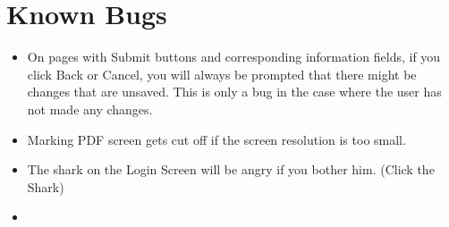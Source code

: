 \documentclass{article}
\begin{document}
\section{Known Bugs}
\begin{itemize}
\item On pages with Submit buttons and corresponding information fields, if you click Back or Cancel, you will always be prompted that there might be changes that are unsaved.  This is only a bug in the case where the user has not made any changes.
\item Marking PDF screen gets cut off if the screen resolution is too small.
\item The shark on the Login Screen will be angry if you bother him.  (Click the Shark)
\item 
\end{itemize}
\end{document}

